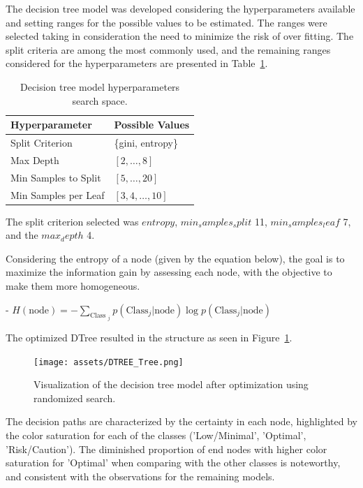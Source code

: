 \documentclass[conference]{IEEEtran}
\begin{document}
The decision tree model was developed considering the hyperparameters available and setting ranges for the possible values to be estimated. The ranges were selected taking in consideration the need to minimize the risk of over fitting. The split criteria are among the most commonly used, and the remaining ranges considered for the hyperparameters are presented in Table~\ref{parametrosDTree}.


\begin{table}[H]
\centering
\caption{Decision tree model hyperparameters search space.}
\label{parametrosDTree}
\begin{tabular}{ll}
\toprule
\textbf{Hyperparameter} & \textbf{Possible Values} \\
\midrule
Split Criterion & \{gini, entropy\} \\ 
Max Depth & $[2, \dots, 8]$ \\ 
Min Samples to Split & $[5, \dots, 20]$ \\ 
Min Samples per Leaf & $[3, 4, \dots, 10]$ \\
\bottomrule
\end{tabular}
\end{table}

The split criterion selected was $entropy$, $min_samples_split$ 11, $min_samples_leaf$ 7, and the $max_depth$ 4.


Considering the entropy of a node (given by the equation below), the goal is to maximize the information gain by assessing each node, with the objective to make them more homogeneous. 

    - $H(\text{node}) = - \sum_{\text{Class }_j} p(\text{Class}_j | \text{node}) \log p(\text{Class}_j | \text{node})$


The optimized DTree resulted in the structure as seen in Figure~\ref{dtree_tree}.

\begin{figure}[H]
    \centering
    \texttt{[image: assets/DTREE\_Tree.png]}
    \caption{Visualization of the decision tree model after optimization using randomized search.}
    \label{dtree_tree}
\end{figure}

The decision paths are characterized by the certainty in each node, highlighted by the color saturation for each of the classes ('Low/Minimal', 'Optimal', 'Risk/Caution'). The diminished proportion of end nodes with higher color saturation for 'Optimal' when comparing with the other classes is noteworthy, and consistent with the observations for the remaining models.
\end{document}
